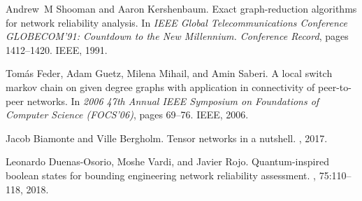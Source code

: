 \documentclass[12pt,twocolumn]{article}
\begin{document}
{\begin{thebibliography}{10}
Andrew~M Shooman and Aaron Kershenbaum.
\newblock Exact graph-reduction algorithms for network reliability analysis.
\newblock In {\em IEEE Global Telecommunications Conference GLOBECOM'91:
  Countdown to the New Millennium. Conference Record}, pages 1412--1420. IEEE,
  1991.

Tom{\'a}s Feder, Adam Guetz, Milena Mihail, and Amin Saberi.
\newblock A local switch markov chain on given degree graphs with application
  in connectivity of peer-to-peer networks.
\newblock In {\em 2006 47th Annual IEEE Symposium on Foundations of Computer
  Science (FOCS'06)}, pages 69--76. IEEE, 2006.

Jacob Biamonte and Ville Bergholm.
\newblock Tensor networks in a nutshell.
, 2017.

Leonardo Duenas-Osorio, Moshe Vardi, and Javier Rojo.
\newblock Quantum-inspired boolean states for bounding engineering network
  reliability assessment.
, 75:110--118, 2018.

\end{thebibliography}

}
\end{document}
